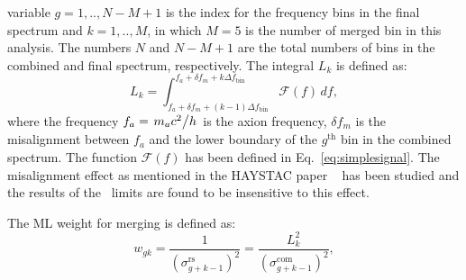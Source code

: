 variable $g = 1,..,N-M+1$ is the index for the frequency bins in the final 
spectrum and $k = 1,..,M$, in which $M = 5$ is the number of merged bin in 
this analysis. The numbers $N$ and $N-M+1$ are the total numbers of bins in 
the combined and final spectrum, respectively. The integral $L_{k}$ is 
defined as: 
\begin{equation}
  \label{eq:Lq_integral}
  L_{k} = \int_{f_a +\delta f_m + (k-1)\Delta f_\text{bin}}^{f_a +\delta f_m + k\Delta f_\text{bin}} \mathcal{F}(f) \,df,
\end{equation}
where the frequency $f_a=\left.m_a c^2\middle/h\right.$ is the axion 
frequency, $\delta f_m$ is the misalignment between $f_a$ and the lower
boundary of the $g^\text{th}$ bin in the combined spectrum.
The function $\mathcal{F}(f)$ has been defined in Eq.~\eqref{eq:simplesignal}. 
The misalignment effect as mentioned in the HAYSTAC paper ~\cite{HAYSTACII} 
has been studied and the results of the \gagg\ limits are found to be 
insensitive to this effect. 




The ML weight for merging is defined as: 
\begin{equation}
    \label{eq:merge_weight}
    w_{gk} = \frac{1}{(\sigma_{g+k-1}^\text{rs})^{2}} = \frac{L_{k}^{2}}{(\sigma_{g+k-1}^\text{com})^{2}},
\end{equation}


